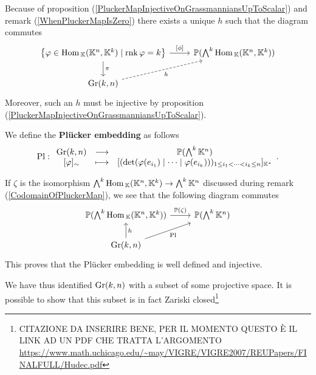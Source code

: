 \begin{remark}
Because of proposition (\ref{PluckerMapInjectiveOnGrassmanniansUpToScalar}) and remark (\ref{WhenPluckerMapIsZero}) there exists a unique $h$ such that the diagram commutes
\[\begin{tikzcd}
	{\cpa{\vp\in \Hom_\K(\K^n,\K^k)\mid \rnk \vp=k}} & {\Pj(\bigwedge^k\Hom_\K(\K^n,\K^k))} \\
	{\Gr(k,n)}
	\arrow["\pi", from=1-1, to=2-1]
	\arrow["{[\phi]}", from=1-1, to=1-2]
	\arrow["h"', dashed, from=2-1, to=1-2]
\end{tikzcd}\]
Moreover, such an $h$ must be injective by proposition (\ref{PluckerMapInjectiveOnGrassmanniansUpToScalar}).
\end{remark}

\begin{definition}
We define the \textbf{Pl\"ucker embedding} as follows
\[\mathrm{Pl}:\begin{array}{ccc} {\mathrm{Gr}(k,n)} & \longrightarrow & {\mathbb{P}(\bigwedge^k\mathbb{K}^n)}\\ {[\varphi]_\sim} & \longmapsto & {[(\det(\varphi(e_{i_1})\mid\cdots\mid\varphi(e_{i_k})))_{1\leq i_1<\cdots<i_k\leq n}]_{\mathbb{K}^\ast}} \end{array}.\]
\end{definition}

\begin{remark}
If $\zeta$ is the isomorphism $\bigwedge^k\mathrm{Hom}\,_{\mathbb{K}}(\mathbb{K}^n,\mathbb{K}^k)\to \bigwedge^k\mathbb{K}^n$ discussed during remark (\ref{CodomainOfPluckerMap}), we see that the following diagram commutes
\[\begin{tikzcd}
	{\Pj(\bigwedge^k\Hom_\K(\K^n,\K^k))} & {\Pj(\bigwedge^k\K^n)} \\
	{\Gr(k,n)}
	\arrow["h"', from=2-1, to=1-1]
	\arrow["{\Pj(\zeta)}", from=1-1, to=1-2]
	\arrow["{\Pl}"', from=2-1, to=1-2]
\end{tikzcd}\]
This proves that the Pl\"ucker embedding is well defined and injective.
\end{remark}

\noindent We have thus identified $\mathrm{Gr}(k,n)$ with a subset of some projective space. It is possible to show that this subset is in fact Zariski closed\footnote{CITAZIONE DA INSERIRE BENE, PER IL MOMENTO QUESTO \`E IL LINK AD UN PDF CHE TRATTA L'ARGOMENTO \url{https://www.math.uchicago.edu/~may/VIGRE/VIGRE2007/REUPapers/FINALFULL/Hudec.pdf}}


